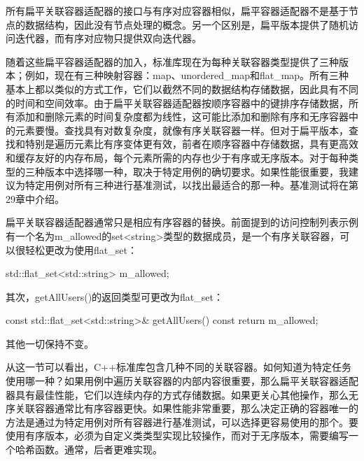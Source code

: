 所有扁平关联容器适配器的接口与有序对应容器相似，扁平容器适配器不是基于节点的数据结构，因此没有节点处理的概念。另一个区别是，扁平版本提供了随机访问迭代器，而有序对应物只提供双向迭代器。

随着这些扁平容器适配器的加入，标准库现在为每种关联容器类型提供了三种版本；例如，现在有三种映射容器：map、unordered\_map和flat\_map。所有三种基本上都以类似的方式工作，它们以截然不同的数据结构存储数据，因此具有不同的时间和空间效率。由于扁平关联容器适配器按顺序容器中的键排序存储数据，所有添加和删除元素的时间复杂度都为线性，这可能比添加和删除有序和无序容器中的元素要慢。查找具有对数复杂度，就像有序关联容器一样。但对于扁平版本，查找和特别是遍历元素比有序变体更有效，前者在顺序容器中存储数据，具有更高效和缓存友好的内存布局，每个元素所需的内存也少于有序或无序版本。对于每种类型的三种版本中选择哪一种，取决于特定用例的确切要求。如果性能很重要，我建议为特定用例对所有三种进行基准测试，以找出最适合的那一种。基准测试将在第29章中介绍。

扁平关联容器适配器通常只是相应有序容器的替换。前面提到的访问控制列表示例有一个名为m\_allowed的set<string>类型的数据成员，是一个有序关联容器，可以很轻松更改为使用flat\_set：

\begin{cpp}
std::flat_set<std::string> m_allowed;
\end{cpp}

其次，getAllUsers()的返回类型可更改为flat\_set：

\begin{cpp}
const std::flat_set<std::string>& getAllUsers() const { return m_allowed; }
\end{cpp}

其他一切保持不变。


从这一节可以看出，C++标准库包含几种不同的关联容器。如何知道为特定任务使用哪一种？如果用例中遍历关联容器的内部内容很重要，那么扁平关联容器适配器具有最佳性能，它们以连续内存的方式存储数据。如果更关心其他操作，那么无序关联容器通常比有序容器更快。如果性能非常重要，那么决定正确的容器唯一的方法是通过为特定用例对所有容器进行基准测试，可以选择更容易使用的那个。要使用有序版本，必须为自定义类类型实现比较操作，而对于无序版本，需要编写一个哈希函数。通常，后者更难实现。










